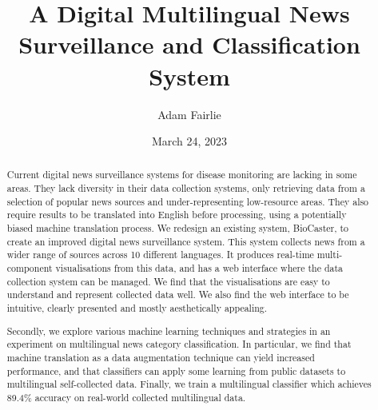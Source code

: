 \documentclass{l4proj}
\begin{document}
\title{A Digital Multilingual News Surveillance and Classification System}
\author{Adam Fairlie}
\date{March 24, 2023}

\maketitle


\begin{abstract}
    Current digital news surveillance systems for disease monitoring are lacking in some areas. They lack diversity in their data collection systems, only retrieving data from a selection of popular news sources and under-representing low-resource areas. They also require results to be translated into English before processing, using a potentially biased machine translation process. We redesign an existing system, BioCaster, to create an improved digital news surveillance system. This system collects news from a wider range of sources across 10 different languages. It produces real-time multi-component visualisations from this data, and has a web interface where the data collection system can be managed. We find that the visualisations are easy to understand and represent collected data well. We also find the web interface to be intuitive, clearly presented and mostly aesthetically appealing. \par Secondly, we explore various machine learning techniques and strategies in an experiment on multilingual news category classification. In particular, we find that machine translation as a data augmentation technique can yield increased performance, and that classifiers can apply some learning from public datasets to multilingual self-collected data. Finally, we train a multilingual classifier which achieves 89.4\% accuracy on real-world collected multilingual data.
\end{abstract}


%
%
\def\consentname {Adam Fairlie} %
\def\consentdate {24 March 2023} %
%
\educationalconsent
\end{document}
